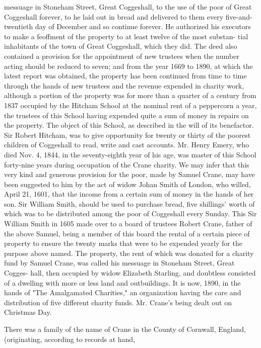 messuage in Stoneham Street, Great Coggeshall, to the use of the 
poor of Great Coggeshall forever, to he laid out in bread and 
delivered to them every five-and-twentieth day of December and 
so continue forever. He authorized his executors to make a 
feoffment of the property to at least twelve of the most substan- 
tial inhabitants of the town of Great Coggeshall, which they did. 
The deed also contained a provision for the appointment of new 
trustees when the number acting should be reduced to seven; 
and from the year 1669 to 1890, at which the latest report was 
obtained, the property has been continued from time to time 
through the hands of new trustees and the revenue expended in 
charity work, although a portion of the property was for more 
than a quarter of a century from 1837 occupied by the Hitcham 
School at the nominal rent of a peppercorn a year, the trustees of 
this School having expended quite a sum of money in repairs on 
the property. The object of this School, as described in the will 
of its benefactor. Sir Robert Hitcham, was to give opportunity 
for twenty or thirty of the poorest children of Coggeshall to read, 
write and cast accounts. Mr. Henry Emery, who died Nov. 4, 
1844, in the seventy-eighth year of his age, was master of this 
School forty-nine years during occupation of the Crane charity. 
We may infer that this very kind and generous provision for the 
poor, made by Samuel Crane, may have been suggested to him 
by the act of widow Johan Smith of London, who willed, April 
21, 1601, that the income from a certain sum of money in the 
hands of her son. Sir William Smith, should be used to purchase 
bread, five shillings' worth of which was to be distributed among 
the poor of Coggeshall every Sunday. This Sir William Smith in 
1605 made over to a board of trustees  Robert Crane, father of 
the above Samuel, being a member of this board  the rental of a 
certain piece of property to ensure the twenty marks that were to 
be expended yearly for the purpose above named. The property, 
the rent of which was donated for a charity fund by Samuel 
Crane, was called his messuage in Stoneham Street, Great Cogges- 
hall, then occupied by widow Elizabeth Starling, and doubtless 
consisted of a dwelling with more or less land and outbuildings. 
It is now, 1890, in the hands of "The Amalgamated Charities," 
an organization having the care and distribution of five different 
charity funds. Mr. Crane's being dealt out on Christmas Day. 

There was a family of the name of Crane in the County of 
Cornwall, England, (originating, according to records at hand, 



